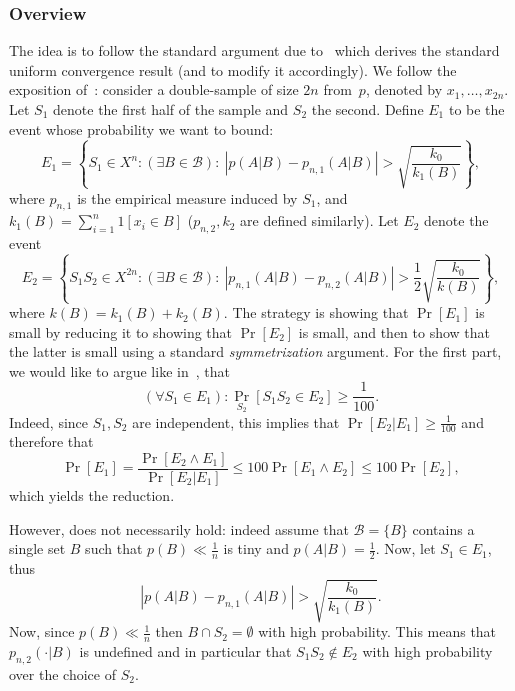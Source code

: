 \documentclass{article}
\def\B{{\mathcal B}}
\begin{document}
\subsubsection{Overview}
The idea is to follow the standard argument due to~\cite{vapnik} 
which derives the standard uniform convergence result (and to modify it accordingly). 
We follow the exposition of~\cite{anthony}:
consider a double-sample of size $2n$ from~$p$, denoted by $x_1,\ldots,x_{2n}$.
Let $S_1$ denote the first half of the sample and $S_2$ the second.
Define $E_1$ to be the event whose probability we want to bound:
\[E_1 = \left\{ S_1\in X^n : (\exists B\in \B):~ 
\left\lvert p(A \vert B) - p_{n,1}(A \vert B) \right\rvert > 
\sqrt{\frac{k_0}{k_{1}(B)}} \right\},\]
where $p_{n,1}$ is the empirical measure induced by $S_1$, 
and $k_{1}(B)=\sum_{i=1}^n 1[x_i\in B]$ ($p_{n,2}, k_{2}$ are defined similarly).
Let $E_2$ denote the event
\[E_2 = 
\left\{
S_1S_2\in X^{2n} : (\exists B\in\B):~
\left\lvert p_{n,1}(A \vert B)   -  p_{n,2}(A \vert B) \right\rvert >  
{\frac{1}{2}}\sqrt{\frac{k_0}{k(B)}}
\right\},
\]
where $k(B) = k_{1}(B)+k_{2}(B)$.
The strategy is showing that $\Pr[E_1]$ is small by reducing it to showing that $\Pr[E_2]$ 
is small, and then to show that the latter is small using a standard \emph{symmetrization} argument. 
For the first part, we would like to argue like in~\cite{anthony}, that
\begin{equation}\label{eq:anthony} 
(\forall S_1\in E_1): \Pr_{S_2}[S_1S_2\in E_2]\geq \frac{1}{100}.
\end{equation}
Indeed, since $S_1,S_2$ are independent, this implies that $\Pr[E_2 \vert E_1]\geq\frac{1}{100}$ 
	and therefore that 
	\[\Pr[E_1] = \frac{\Pr[E_2\land E_1]}{\Pr[E_2 \vert E_1]}\leq 100\Pr[E_1\land E_2] \leq 100\Pr[E_2],\] 
	which yields the reduction.

However,  does not necessarily hold: indeed assume that $\B=\{B\}$ contains
	a single set $B$ such that $p(B) \ll \frac{1}{n}$ is tiny and $p(A \vert B) = \frac{1}{2}$. 
	Now, let $S_1\in E_1$, thus
	\[
	\left\lvert p(A \vert B) - p_{n,1}(A \vert B) \right\rvert > 
	\sqrt{\frac{k_0}{k_{1}(B)}}.
	\]
	Now, since $p(B) \ll \frac{1}{n}$ then $B\cap S_2 = \emptyset$ with high probability.
	This means that $p_{n,2}(\cdot \vert B)$ is undefined and in particular that $S_1S_2\notin E_2$ 
	with high probability over the choice of $S_2$.

%
\end{document}
